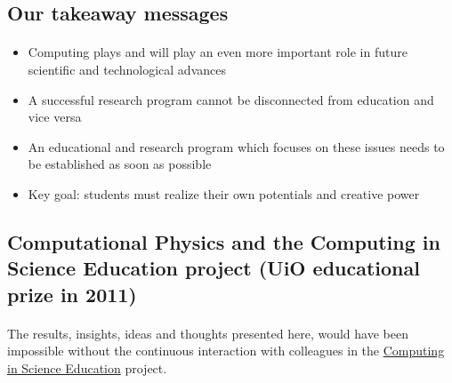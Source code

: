 \documentclass[%
twoside,                 %
final,                   %
10pt]{article}
\begin{document}
\subsection*{Our takeaway messages}

\paragraph{}
\begin{itemize}
\item Computing plays and will play an even more important role in future scientific and technological advances

\item A successful research program cannot be disconnected from education and vice versa

\item An educational and research program which focuses on these issues needs to be established as soon as possible

\item Key goal: students must realize their own potentials and creative power
\end{itemize}

\noindent




\subsection*{Computational Physics and  the Computing in Science Education project (UiO educational prize in 2011)}


\paragraph{}
The results, insights, ideas and thoughts presented here, would have been impossible without the continuous interaction with colleagues in the \href{{http://www.mn.uio.no/english/about/collaboration/cse/}}{Computing in Science Education} project.



\end{document}
